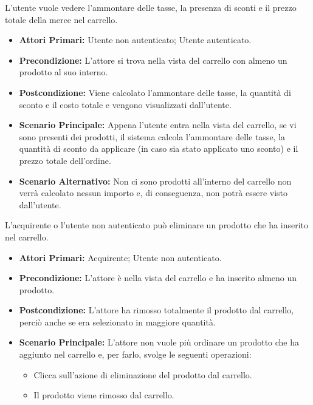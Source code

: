 \resetSubUC

L'utente vuole vedere l'ammontare delle tasse, la presenza di sconti e il prezzo totale della merce nel carrello.
\begin{itemize}
    \item \textbf{Attori Primari:} Utente non autenticato; Utente autenticato.
    \item \textbf{Precondizione:} L'attore si trova nella vista del carrello con almeno un prodotto al suo interno.
    \item \textbf{Postcondizione:} Viene calcolato l'ammontare delle tasse, la quantità di sconto e il costo totale e vengono visualizzati dall'utente.
    \item \textbf{Scenario Principale:} Appena l'utente entra nella vista del carrello, se vi sono presenti dei prodotti, il sistema calcola l'ammontare delle tasse, la quantità di sconto da applicare (in caso sia stato applicato uno sconto) e il prezzo totale dell'ordine.
    \item \textbf{Scenario Alternativo:} Non ci sono prodotti all'interno del carrello non verrà calcolato nessun importo e, di conseguenza, non potrà essere visto dall'utente.
\end{itemize}

L'acquirente o l'utente non autenticato può eliminare un prodotto che ha inserito nel carrello.
\begin{itemize}
    \item \textbf{Attori Primari:} Acquirente; Utente non autenticato.
    \item \textbf{Precondizione:} L'attore è nella vista del carrello e ha inserito almeno un prodotto.
    \item \textbf{Postcondizione:} L'attore ha rimosso totalmente il prodotto dal carrello, perciò anche se era selezionato in maggiore quantità.
    \item \textbf{Scenario Principale:} L'attore non vuole più ordinare un prodotto che ha aggiunto nel carrello e, per farlo, svolge le seguenti operazioni:
    \begin{itemize}
        \item Clicca sull'azione di eliminazione del prodotto dal carrello.
        \item Il prodotto viene rimosso dal carrello.
    \end{itemize}
\end{itemize}

